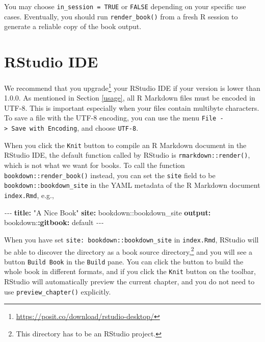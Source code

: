 \documentclass[
  12pt,
]{krantz}
\newenvironment{Shaded}{\begin{snugshade}}{\end{snugshade}}
\newcommand{\AttributeTok}[1]{\textcolor[rgb]{0.13,0.29,0.53}{#1}}
\newcommand{\FunctionTok}[1]{\textcolor[rgb]{0.13,0.29,0.53}{\textbf{#1}}}
\newcommand{\KeywordTok}[1]{\textcolor[rgb]{0.13,0.29,0.53}{\textbf{#1}}}
\newcommand{\PreprocessorTok}[1]{\textcolor[rgb]{0.56,0.35,0.01}{\textit{#1}}}
\newcommand{\StringTok}[1]{\textcolor[rgb]{0.31,0.60,0.02}{#1}}
\renewcommand{\href}[2]{#2\footnote{\url{#1}}}
\theoremstyle{definition}
\theoremstyle{definition}
\theoremstyle{definition}
\theoremstyle{definition}
\theoremstyle{remark}
\begin{document}
You may choose \texttt{in\_session\ =\ TRUE} or \texttt{FALSE} depending on your specific use cases. Eventually, you should run \texttt{render\_book()} from a fresh R session to generate a reliable copy of the book output.

\section{RStudio IDE}\label{rstudio-ide}

We recommend that you \href{https://posit.co/download/rstudio-desktop/}{upgrade} your RStudio IDE if your version is lower than 1.0.0. As mentioned in Section \ref{usage}, all R Markdown files must be encoded in UTF-8. This is important especially when your files contain multibyte characters. To save a file with the UTF-8 encoding, you can use the menu \texttt{File\ -\textgreater{}\ Save\ with\ Encoding}, and choose \texttt{UTF-8}.

When you click the \texttt{Knit} button to compile an R Markdown document in the RStudio IDE, the default function called by RStudio is \texttt{rmarkdown::render()}, which is not what we want for books. To call the function \texttt{bookdown::render\_book()} instead, you can set the \texttt{site} field to be \texttt{bookdown::bookdown\_site} in the YAML metadata of the R Markdown document \texttt{index.Rmd}, e.g.,

\begin{Shaded}
\begin{Highlighting}[]
\PreprocessorTok{{-}{-}{-}}
\FunctionTok{title}\KeywordTok{:}\AttributeTok{ }\StringTok{"A Nice Book"}
\FunctionTok{site}\KeywordTok{:}\AttributeTok{ bookdown::bookdown\_site}
\FunctionTok{output}\KeywordTok{:}
\AttributeTok{  bookdown:}\FunctionTok{:gitbook}\KeywordTok{:}\AttributeTok{ default}
\PreprocessorTok{{-}{-}{-}}
\end{Highlighting}
\end{Shaded}

When you have set \texttt{site:\ bookdown::bookdown\_site} in \texttt{index.Rmd}, RStudio will be able to discover the directory as a book source directory,\footnote{This directory has to be an RStudio project.} and you will see a button \texttt{Build\ Book} in the \texttt{Build} pane. You can click the button to build the whole book in different formats, and if you click the \texttt{Knit} button on the toolbar, RStudio will automatically preview the current chapter, and you do not need to use \texttt{preview\_chapter()} explicitly.
\end{document}

